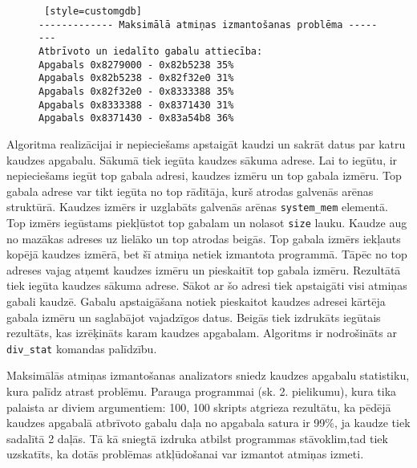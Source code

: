 \begin{figure}[h]
\begin{lstlisting} [style=customgdb]
------------- Maksimālā atmiņas izmantošanas problēma --------
Atbrīvoto un iedalīto gabalu attiecība:
Apgabals 0x8279000 - 0x82b5238 35%
Apgabals 0x82b5238 - 0x82f32e0 31%
Apgabals 0x82f32e0 - 0x8333388 35%
Apgabals 0x8333388 - 0x8371430 31%
Apgabals 0x8371430 - 0x83a54b8 36%
\end{lstlisting}
\caption{\textbf{\fontsize{11}{12}\selectfont {Maksimālā atmiņas izmantošanas rādītājs}}}
\end{figure}

Algoritma realizācijai ir nepieciešams apstaigāt kaudzi un sakrāt datus par katru kaudzes apgabalu.
Sākumā tiek iegūta kaudzes sākuma adrese.
Lai to iegūtu, ir nepieciešams iegūt top gabala adresi, kaudzes izmēru un top gabala izmēru.
Top gabala adrese var tikt iegūta no top rādītāja, kurš atrodas galvenās arēnas struktūrā.
Kaudzes izmērs ir uzglabāts galvenās arēnas \texttt{system\_mem} elementā.
Top izmērs iegūstams piekļūstot top gabalam un nolasot \texttt{size} lauku.
Kaudze aug no mazākas adreses uz lielāko un top atrodas beigās.
Top gabala izmērs iekļauts kopējā kaudzes izmērā, bet šī atmiņa netiek izmantota programmā.
Tāpēc no top adreses vajag atņemt kaudzes izmēru un pieskaitīt top gabala izmēru.
Rezultātā tiek iegūta kaudzes sākuma adrese.
Sākot ar šo adresi tiek apstaigāti visi atmiņas gabali kaudzē.
Gabalu apstaigāšana notiek pieskaitot kaudzes adresei kārtēja gabala izmēru un saglabājot vajadzīgos datus.
Beigās tiek izdrukāts iegūtais rezultāts, kas izrēķināts karam kaudzes apgabalam.
Algoritms ir nodrošināts ar \texttt{div\_stat} komandas palīdzību.

Maksimālās atmiņas izmantošanas analizators sniedz kaudzes apgabalu statistiku, kura palīdz atrast problēmu.
Parauga programmai (sk. 2. pielikumu), kura tika palaista ar diviem argumentiem: 100, 100 skripts atgrieza rezultātu, ka pēdējā kaudzes apgabalā atbrīvoto gabalu daļa no apgabala satura ir 99\%, ja kaudze tiek sadalītā 2 daļās.
Tā kā sniegtā izdruka atbilst programmas stāvoklim,tad tiek uzskatīts, ka dotās problēmas atkļūdošanai var izmantot atmiņas izmeti.

